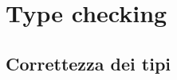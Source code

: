 \documentclass[../main.tex]{subfiles}
\begin{document}
\chapter{Type checking}\label{c:typechecking}
\section{Correttezza dei tipi}
\end{document}
